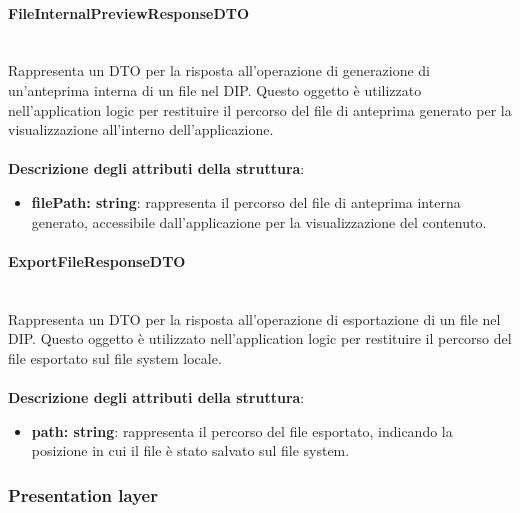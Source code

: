 \documentclass[a4paper,12pt]{article}
\begin{document}
{{{                \paragraph{FileInternalPreviewResponseDTO}\label{par:FileInternalPreviewResponseDTO}\mbox{}\\
                Rappresenta un DTO per la risposta all'operazione di generazione di un'anteprima interna di un file nel DIP. Questo oggetto è utilizzato nell'application logic per restituire il percorso del file di anteprima generato per la visualizzazione all'interno dell'applicazione.\\
                \\
                \textbf{Descrizione degli attributi della struttura}:
                \begin{itemize}
                    \item \textbf{filePath: string}: rappresenta il percorso del file di anteprima interna generato, accessibile dall'applicazione per la visualizzazione del contenuto.
                \end{itemize}
                \paragraph{ExportFileResponseDTO}\label{par:ExportFileResponseDTO}\mbox{}\\
                Rappresenta un DTO per la risposta all'operazione di esportazione di un file nel DIP. Questo oggetto è utilizzato nell'application logic per restituire il percorso del file esportato sul file system locale.\\
                \\
                \textbf{Descrizione degli attributi della struttura}:
                \begin{itemize}
                    \item \textbf{path: string}: rappresenta il percorso del file esportato, indicando la posizione in cui il file è stato salvato sul file system.
                \end{itemize}
            }
            
            \subsubsection{Presentation layer}
}}
\end{document}
